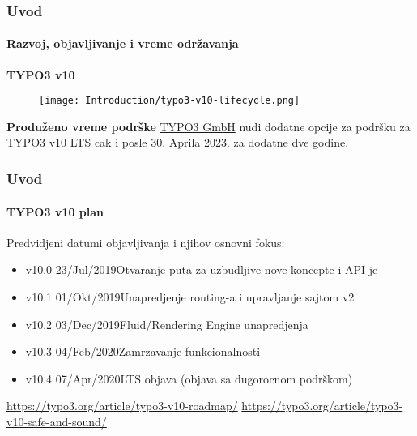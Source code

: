 
\begin{frame}[fragile]
	\frametitle{Uvod}
	\framesubtitle{Razvoj, objavljivanje i vreme održavanja}

	\textbf{TYPO3 v10}

	\begin{figure}
		\texttt{[image: Introduction/typo3-v10-lifecycle.png]}
	\end{figure}

	\textbf{Produženo vreme podrške}\newline
	\smaller
		\href{https://typo3.com}{TYPO3 GmbH} nudi dodatne opcije za podršku za
		TYPO3 v10 LTS cak i posle 30. Aprila 2023. za dodatne dve godine.
	\normalsize

\end{frame}


\begin{frame}[fragile]
	\frametitle{Uvod}
	\framesubtitle{TYPO3 v10 plan}

	Predvidjeni datumi objavljivanja i njihov osnovni fokus:

	\begin{itemize}

		\item
			\begingroup
				\color{typo3orange}
				v10.0 \tabto{1.1cm}23/Jul/2019\tabto{3.4cm}Otvaranje puta za uzbudljive nove koncepte i API-je
			\endgroup
		\item v10.1 \tabto{1.1cm}01/Okt/2019\tabto{3.4cm}Unapredjenje routing-a i upravljanje sajtom v2
		\item v10.2 \tabto{1.1cm}03/Dec/2019\tabto{3.4cm}Fluid/Rendering Engine unapredjenja
		\item v10.3 \tabto{1.1cm}04/Feb/2020\tabto{3.4cm}Zamrzavanje funkcionalnosti
		\item v10.4 \tabto{1.1cm}07/Apr/2020\tabto{3.4cm}LTS objava (objava sa dugorocnom podrškom)

	\end{itemize}

	\smaller
		\url{https://typo3.org/article/typo3-v10-roadmap/}\newline
		\url{https://typo3.org/article/typo3-v10-safe-and-sound/}
	\normalsize

\end{frame}

